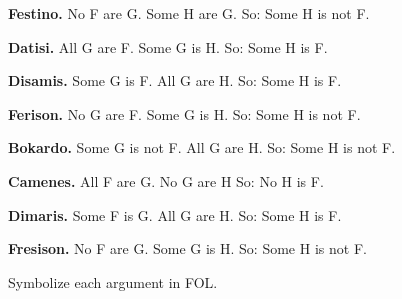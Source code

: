 \begin{practiceproblems}
\begin{earg}
	\item \textbf{Festino.} No F are G. Some H are G. So: Some H is not F.
	\item[] 
	\item \textbf{Datisi.} All G are F. Some G is H. So: Some H is F.
	\item[] 
	\item \textbf{Disamis.} Some G is F. All G are H. So: Some H is F.
	\item[] 
	\item \textbf{Ferison.} No G are F. Some G is H. So: Some H is not F.
	\item[] 
	\item \textbf{Bokardo.} Some G is not F. All G are H. So:  Some H is not F.
	\item[] 
	\item \textbf{Camenes.} All F are G. No G are H So: No H is F.
	\item[] 
	\item \textbf{Dimaris.} Some F is G. All G are H. So: Some H is F.
	\item[] 
	\item \textbf{Fresison.} No F are G. Some G is H. So: Some H is not F.
	\item[] 
\end{earg}
Symbolize each argument in FOL.


\end{practiceproblems}
